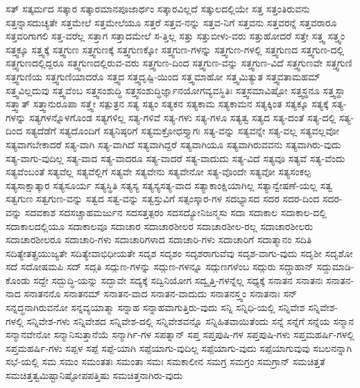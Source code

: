 {ಸತ್
ಸತ್ಕರ್ಮದ
ಸತ್ಕಾರ
ಸತ್ಕಾರಮಾನಪೂಜಾರ್ಥಂ
ಸತ್ಕಾರವಿಲ್ಲದೆ
ಸತ್ಕುಲದಲ್ಲಿಯೇ
ಸತ್ತ
ಸತ್ತಂತಿರುವನು
ಸತ್ತನ್ನಾಸದುಚ್ಯತೇ
ಸತ್ತಮೇಲೆ
ಸತ್ತಮೇಲೆಯೂ
ಸತ್ತರೆ
ಸತ್ತವ-ನನ್ನು
ಸತ್ತವ-ನಿಗೆ
ಸತ್ತವನು
ಸತ್ತವರನ್ನೆ
ಸತ್ತವರಾರೂ
ಸತ್ತವರಿಗಾಗಲಿ
ಸತ್ತ-ವರೆಲ್ಲ
ಸತ್ತಾಗ
ಸತ್ತಾದಮೇಲೆ
ಸ-ತ್ತಿಲ್ಲ
ಸತ್ತು
ಸತ್ತುಬೀಳು-ವರು
ಸತ್ತುಹೋದರೆ
ಸತ್ತೇ
ಸತ್ತ್ವ
ಸತ್ತ್ವಂ
ಸತ್ತ್ವಕ್ಕೂ
ಸತ್ತ್ವಕ್ಕೆ
ಸತ್ತ್ವಗುಣ
ಸತ್ತ್ವಗುಣಕ್ಕೆ
ಸತ್ತ್ವಗುಣಕ್ಕೋ
ಸತ್ತ್ವಗುಣ-ಗಳನ್ನು
ಸತ್ತ್ವಗುಣ-ಗಳಲ್ಲಿ
ಸತ್ತ್ವಗುಣದ
ಸತ್ತ್ವಗುಣ-ದಲ್ಲಿ
ಸತ್ತ್ವಗುಣದಲ್ಲಿದ್ದರೂ
ಸತ್ತ್ವಗುಣದಲ್ಲಿರುವ-ವರು
ಸತ್ತ್ವಗುಣ-ದಿಂದ
ಸತ್ತ್ವಗುಣ-ವನ್ನು
ಸತ್ತ್ವಗುಣ-ವಿದೆ
ಸತ್ತ್ವಗುಣವೇ
ಸತ್ತ್ವಗುಣಿ
ಸತ್ತ್ವಗುಣಿಯ
ಸತ್ತ್ವಗುಣಿಯಾದರೊ
ಸತ್ತ್ವದ
ಸತ್ತ್ವದೃಷ್ಟಿ-ಯಿಂದ
ಸತ್ತ್ವಮಾಹೋ
ಸತ್ತ್ವಮಿತ್ಯುತ
ಸತ್ತ್ವವತಾಮಹಮ್
ಸತ್ತ್ವವಿಲ್ಲದುವು
ಸತ್ತ್ವವೆಂಬ
ಸತ್ತ್ವಸಂಶುದ್ಧಿ
ಸತ್ತ್ವಸಂಶುದ್ಧಿರ್ಜ್ಞಾನಯೋಗವ್ಯವಸ್ಥಿತಿಃ
ಸತ್ತ್ವಸಮಾವಿಷ್ಟೋ
ಸತ್ತ್ವಸ್ಥನೂ
ಸತ್ತ್ವಸ್ಥಾ
ಸತ್ತ್ವಾತ್
ಸತ್ತ್ವಾನುರೂಪಾ
ಸತ್ತ್ವೇ
ಸತ್ಪುತ್ರನ
ಸತ್ಯ
ಸತ್ಯಂ
ಸತ್ಯಕನ
ಸತ್ಯಕಾಮ
ಸತ್ಯಕಾಮನ
ಸತ್ಯಕ್ಕಿಂತ
ಸತ್ಯಕ್ಕೂ
ಸತ್ಯಕ್ಕೆ
ಸತ್ಯ-ಗಳನ್ನು
ಸತ್ಯಗಳನ್ನೊಳಗೊಂಡ
ಸತ್ಯಗಳಿಲ್ಲ
ಸತ್ಯ-ಗಳಿವೆ
ಸತ್ಯ-ಗಳು
ಸತ್ಯ-ಗಳೂ
ಸತ್ಯತ್ವ
ಸತ್ಯದ
ಸತ್ಯ-ದಂತೆ
ಸತ್ಯ-ದಲ್ಲಿ
ಸತ್ಯ-ದಿಂದ
ಸತ್ಯದೆಡೆಗೆ
ಸತ್ಯದೊಂದಿಗೆ
ಸತ್ಯನಿಷ್ಠರಿಗೆ
ಸತ್ಯಮಕ್ರೋಧಸ್ತ್ಯಾಗಃ
ಸತ್ಯ-ವನ್ನು
ಸತ್ಯವನ್ನೇ
ಸತ್ಯ-ವಲ್ಲ
ಸತ್ಯವಲ್ಲವೋ
ಸತ್ಯವಾಗಬೇಕಾದರೆ
ಸತ್ಯ-ವಾಗಿ
ಸತ್ಯ-ವಾಗಿದೆ
ಸತ್ಯವಾಗಿದ್ದರೆ
ಸತ್ಯವಾಗಿಯೂ
ಸತ್ಯವಾಗಿರುವವನು
ಸತ್ಯವಾಗಿರು-ವುದು
ಸತ್ಯ-ವಾಗು-ವುದಿಲ್ಲ
ಸತ್ಯ-ವಾದ
ಸತ್ಯ-ವಾದರೂ
ಸತ್ಯ-ವಾದರೆ
ಸತ್ಯ-ವಾದುದು
ಸತ್ಯ-ವಿದೆ
ಸತ್ಯವೂ
ಸತ್ಯವೆ
ಸತ್ಯ-ವೆಂದು
ಸತ್ಯವೆಂಬಂತೆ
ಸತ್ಯವೆಲ್ಲ
ಸತ್ಯವೆಲ್ಲಿಗೆ
ಸತ್ಯವೇ
ಸತ್ಯವೇನು
ಸತ್ಯವೇನೋ
ಸತ್ಯ-ವೊಂದೇ
ಸತ್ಯವೋ
ಸತ್ಯಸಂಕಲ್ಪ
ಸತ್ಯಸಾಕ್ಷಾತ್ಕಾರ
ಸತ್ಯಸೂರ್ಯ
ಸತ್ಯಸ್ಥಿತಿ
ಸತ್ಯಸ್ಯ
ಸತ್ಯಸ್ಯಸತ್ಯ-ವಾದ
ಸತ್ಯಾಕಾಂಕ್ಷಿಯಾಗಿಲ್ಲ
ಸತ್ಯಾನ್ವೇಷಣೆ-ಯಲ್ಲ
ಸತ್ವ
ಸತ್ವಗುಣ
ಸತ್ವಗುಣ-ವನ್ನು
ಸತ್ವದ
ಸತ್ವ-ವನ್ನು
ಸತ್ವಸ್ತುವಿಗೆ
ಸತ್ಸಂಸ್ಕಾರ-ಗಳ
ಸದಭ್ಯಾಸದ
ಸದರ
ಸದರ-ದಿಂದ
ಸದರ-ವನ್ನು
ಸದವಕಾಶ
ಸದಸಚ್ಚಾಹಮರ್ಜುನ
ಸದಸತ್ತತ್ಪರಂ
ಸದಸದ್ಯೋನಿಜನ್ಮಸು
ಸದಾ
ಸದಾಕಾಲ
ಸದಾಕಾಲ-ದಲ್ಲಿ
ಸದಾಕಾಲದಲ್ಲಿಯೂ
ಸದಾಕಾಲವೂ
ಸದಾಚಾರ
ಸದಾಚಾರಶೀಲರ
ಸದಾಚಾರಶೀಲ-ರಲ್ಲ
ಸದಾಚಾರಶೀಲರು
ಸದಾಚಾರಶೀಲರೂ
ಸದಾಚಾರಿ-ಗಳು
ಸದಾಚಾರಿಗಳಾದ
ಸದಾಚಾರಿ-ಗಳು
ಸದಾಚಾರಿಗೆ
ಸದಾತ್ಮಾನಂ
ಸದಿತಿ
ಸದಿತ್ಯೇತತ್ಪ್ರಯುಜ್ಯತೇ
ಸದಿತ್ಯೇವಾಭಿಧೀಯತೇ
ಸದೃಶ
ಸದೃಶಂ
ಸದೃಶರಾಗುವೆವು
ಸದೃಶ-ವಾಗು-ವುದು
ಸದೃಶೀ
ಸದೃಶೋ
ಸದೆ
ಸದೋಷಮಪಿ
ಸದ್
ಸದ್ಗತಿ
ಸದ್ಗುಣ-ಗಳನ್ನು
ಸದ್ಗುಣ-ಗಳನ್ನೂ
ಸದ್ಗುಣಗಳೆಂಬ
ಸದ್ಗುರು
ಸದ್ಗ್ರಾಹಾನ್
ಸದ್ದುಮಾಡಿ-ಕೊಂಡು
ಸದ್ದೇ
ಸದ್ಬುದ್ಧಿ-ಯನ್ನು
ಸದ್ಭಾವೇ
ಸದ್ಯಕ್ಕೆ
ಸದ್ವಿನಿಯೋಗ
ಸದ್ವೃತ್ತಿ-ಗಳನ್ನೆಲ್ಲ
ಸಧ್ಯಕ್ಕೆ
ಸನಾತನ
ಸನಾತನಃ
ಸನಾತನ-ನಾದ
ಸನಾತನನೊ
ಸನಾತನಮ್
ಸನಾತನ-ವಾದ
ಸನಾತನ-ವಾದುದು
ಸನಾತನಸ್ತ್ವಂ
ಸನಾತನಾಃ
ಸನ್
ಸನ್ನದ್ಧನಾಗಿರುವನೋ
ಸನ್ನವ್ಯಯಾತ್ಮಾ
ಸನ್ನಾಹ
ಸನ್ನಾಹವಾಗುತ್ತಿರು-ವುದು
ಸನ್ನಿ
ಸನ್ನಿಧಿ-ಯಲ್ಲಿ
ಸನ್ನಿವೇಶ
ಸನ್ನಿವೇಶ-ಗಳಲ್ಲಿ
ಸನ್ನಿವೇಶ-ಗಳು
ಸನ್ನಿವೇಶದ
ಸನ್ನಿವೇಶ-ದಲ್ಲಿ
ಸನ್ನಿವೇಶವನ್ನೊ
ಸನ್ನಿಹಿತವಾಯಿತೆಂದು
ಸನ್ನೆ
ಸನ್ನೆಗೆ
ಸನ್ನೆಯ
ಸನ್ಮಾನ
ಸನ್ಮಾನವೇನೋ
ಸನ್ಮಾನಿಸುತ್ತಾನೆಯೆ
ಸನ್ಮಾರ್ಗಿ-ಗಳ
ಸಪತ್ನಾನ್
ಸಪ್ತ
ಸಪ್ತಪುಷಿ-ಗಳ
ಸಪ್ತಪುಷಿ-ಗಳು
ಸಪ್ತಮಹರ್ಷಿ-ಗಳಲ್ಲಿ
ಸಪ್ತಮಹರ್ಷಿ-ಗಳು
ಸಪ್ಪಳ
ಸಪ್ಪೆ
ಸಪ್ಪೆ-ಯಾಗಿ
ಸಪ್ಪೆಯಾಗು-ವುದಿಲ್ಲ
ಸಪ್ಪೆಯಾಗು-ವುದು
ಸಪ್ಪೆಯಾಗುವುವು
ಸಬಲನನ್ನಾಗಿ
ಸಭೆ-ಯಲ್ಲಿ
ಸಮ
ಸಮಂ
ಸಮಂತತಃ
ಸಮಂತಾ
ಸಮಃ
ಸಮಕಾಲೀನ
ಸಮಗ್ರ
ಸಮಗ್ರಂ
ಸಮಗ್ರಾನ್
ಸಮಚಿತ್ತತೆ
ಸಮಚಿತ್ತತ್ವಮಿಷ್ಟಾನಿಷ್ಟೋಪಪತ್ತಿಷು
ಸಮಚಿತ್ತನಾಗಿರು-ವುದು
}
